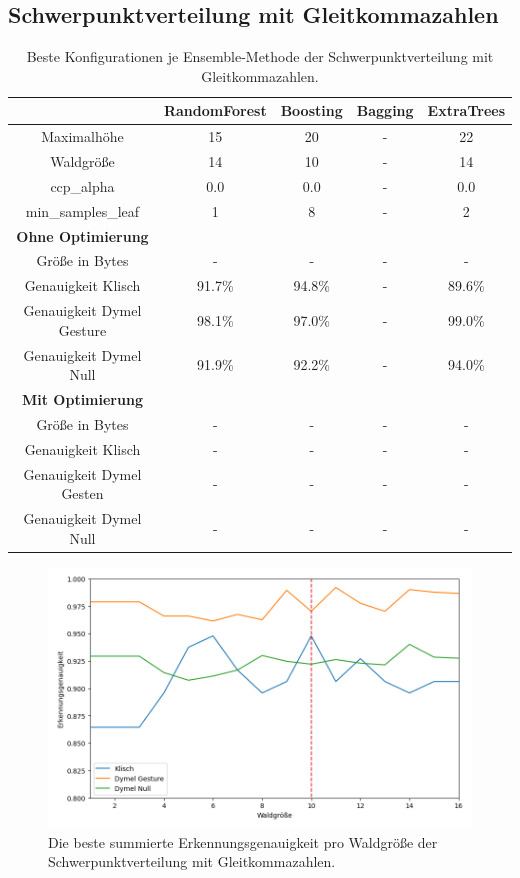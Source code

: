 \subsection{Schwerpunktverteilung mit Gleitkommazahlen}
\begin{table}[h!]
    \centering
    \begin{tabular}{ | c | c | c | c | c |}
        \hline
        & RandomForest & Boosting & Bagging & ExtraTrees \\\hline
        Maximalhöhe & 15 & 20 & - & 22 \\\hline
        Waldgröße & 14 & 10 & - & 14 \\\hline
        ccp\_alpha & 0.0 & 0.0 & - & 0.0 \\\hline
        min\_samples\_leaf & 1 & 8 & - & 2 \\\hline
        \textbf{Ohne Optimierung} &  &  &  &  \\\hline
        Größe in Bytes & - & - & - & - \\\hline
        Genauigkeit Klisch & 91.7\% & 94.8\% & - & 89.6\% \\\hline
        Genauigkeit Dymel Gesture & 98.1\% & 97.0\% & - & 99.0\% \\\hline
        Genauigkeit Dymel Null & 91.9\% & 92.2\% & - & 94.0\% \\\hline
        \textbf{Mit Optimierung} &  &  &  &  \\\hline
        Größe in Bytes & - & - & - & - \\\hline
        Genauigkeit Klisch & - & - & - & - \\\hline
        Genauigkeit Dymel Gesten & - & - & - & - \\\hline
        Genauigkeit Dymel Null & - & - & - & - \\\hline
    \end{tabular}
    \caption{Beste Konfigurationen je Ensemble-Methode der Schwerpunktverteilung mit Gleitkommazahlen.}
    \label{tab:schwerpunktverteilung_float}
\end{table}
\begin{figure}[h!]
    \centering
    \includegraphics[width=\linewidth]{images/cocd_float_acc_per_size.png}
    \caption{Die beste summierte Erkennungsgenauigkeit pro Waldgröße der Schwerpunktverteilung mit Gleitkommazahlen.}
    \label{fig:cocd_float_per_forest_size}
\end{figure}
